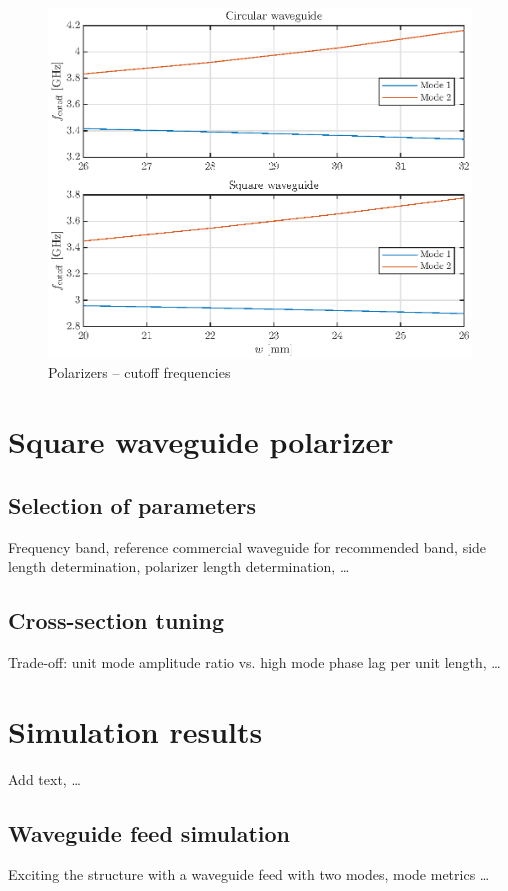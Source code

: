 \documentclass[11pt,a4paper,twoside,openany]{report}
\begin{document}
\begin{figure}[!ht]
    \centering
    \includegraphics[width=\textwidth]{src/polarizers_cutoff_frequencies.eps}
    \caption{\label{fig:polarizers-cutoff-frequencies}Polarizers -- cutoff frequencies}
\end{figure}

\section{Square waveguide polarizer}

\subsection{Selection of parameters}
Frequency band, reference commercial waveguide for recommended band, side length determination, polarizer length determination, \dots

\subsection{Cross-section tuning}
Trade-off: unit mode amplitude ratio vs. high mode phase lag per unit length, \dots

\section{Simulation results}
Add text, \dots

\subsection{Waveguide feed simulation}
Exciting the structure with a waveguide feed with two modes, mode metrics \dots
\end{document}
